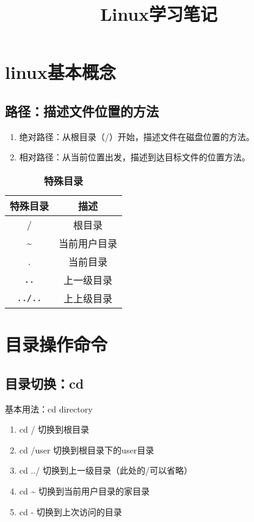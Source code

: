 \documentclass{article}
\title{\Huge\textcolor{orange!70}{Linux学习笔记}}
\author{}
\date{}
\begin{document}
\maketitle
\tableofcontents
\thispagestyle{empty}

\newpage
\setcounter{page}{1}
\section{linux基本概念}

\subsection{路径：描述文件位置的方法}

\begin{enumerate}
    \item 绝对路径：从根目录（/）开始，描述文件在磁盘位置的方法。
    \item 相对路径：从当前位置出发，描述到达目标文件的位置方法。
\end{enumerate}

\begin{table}[htb]
\centering
\caption{\textbf{特殊目录}}
\begin{tabular}{c|c}
\hline
\textbf{特殊目录}&\textbf{描述}\\ 
\hline
/&根目录\\
\~{}&当前用户目录\\
.&当前目录\\
\verb|..|&上一级目录\\
\verb|../..|&上上级目录\\
\hline
\end{tabular}
\end{table}

\section{目录操作命令}
\subsection{目录切换：cd}
基本用法：cd directory
\begin{enumerate}
    \item cd / 切换到根目录
    \item cd /user 切换到根目录下的user目录
    \item cd ../ 切换到上一级目录（此处的/可以省略）
    \item cd \~{} 切换到当前用户目录的家目录
    \item cd - 切换到上次访问的目录
\end{enumerate}
\end{document}
